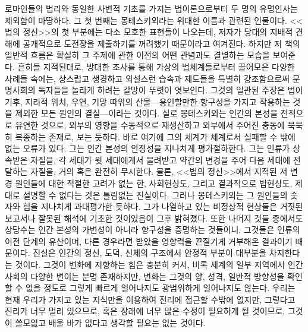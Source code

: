 로마인들의 법리와 동일한 사변적 기초를 가지는 법이론으로부터
두 명의 유명인사는 제외함이 마땅하다.
그 첫 번째는 몽테스키외라는 위대한 이름과 관련된 인물이다.
<<법의 정신>>의 첫 부분에는 다소 모호한 표현들이 나오는데,
저자가 당대의 지배적 견해에 공개적으로 도전장을 제출하기를 꺼려했기
때문이라고 여겨진다.
하지만 저 책의 일반적 흐름은 확실히 그 주제에 관한 이전의 어떤 관념과도
결별하는 모습을 보여준다.
흔히들 지적된대로,
방대한 조사를 통해 가상의 법체계들로부터 끌어모은 다양한 사례들 속에는,
상스럽고 생경하고 외설스런 습속과 제도들을 특별히 강조함으로써
문명사회의 독자들을 놀라게 하려는 갈망이 뚜렷이 엿보인다.
그것의 일관된 주장은 법이 기후, 지리적 위치, 우연, 기망 따위의
산물---용인할만한 항구성을 가지고 작용하는 것을 제외한 모든 원인의
결실---이라는 것이다.
실로 몽테스키외는 인간의 본성을 전적으로 유연한 것으로,
외부의 영향을 수동적으로 재생산하고 외부에서 주어진 충동에 묵묵히 복종하는
존재로, 보는 듯하다.
바로 여기에 그의 체계가 체계로서 실패할 수 밖에 없는 오류가 있다.
그는 인간 본성의 안정성을 지나치게 평가절하한다.
그는 인류가 상속받은 자질을,
각 세대가 윗 세대에게서 물려받고 약간의 변경을 주어 다음 세대에
전달하는 자질을,
거의 혹은 완전히 무시한다.
물론, <<법의 정신>>에서 지적된 저 변경 원인들에 대한 적절한 고려가
없는 한, 사회현상도, 그리고 결과적으로 법현상도, 제대로 설명할 수 없다는
것은 틀림없는 진실이다.
그러나 몽테스키외는 그 원인들의 숫자와 힘을 지나치게 과대평가한 듯하다.
그가 나열하고 있는 비정상적 현상들은 거짓된 보고서나
잘못된 해석에 기초한 것이었음이 그후 밝혀졌다.
또한 나머지 것들 중에서도 상당수는 인간 본성의 가변성이 아니라
항구성을 증명하는 것들이니,
그것들은 인류의 이전 단계의 유산이며,
다른 경우라면 받았을 영향력을 끈질기게 거부해온
결과이기 때문이다.
진실은 인간의 정신, 도덕, 신체의 구조에서 안정적 부분이 대부분을
차지한다는 것이다.
그것이 변화에 저항하는 힘은 충분히 커서,
비록 세계의 일부 지역에서 인간 사회의 다양한 변이는 분명 존재하지만,
변화는 그것의 양, 성격, 일반적 방향성을 확인할 수 없을 정도로
그렇게 빠르게 일어나지도 광범위하게 일어나지도 않는다.
우리는
현재 우리가 가지고 있는 지식만을 이용하여 진리에 접근할 수밖에 없지만,
그렇다고
진리가 너무 멀리 있으므로, 혹은 
장래에 너무 많은 수정이 필요하게 될 것이므로,
그것이 쓸모없고 배울 바가 없다고 생각할 필요는 없는 것이다.


